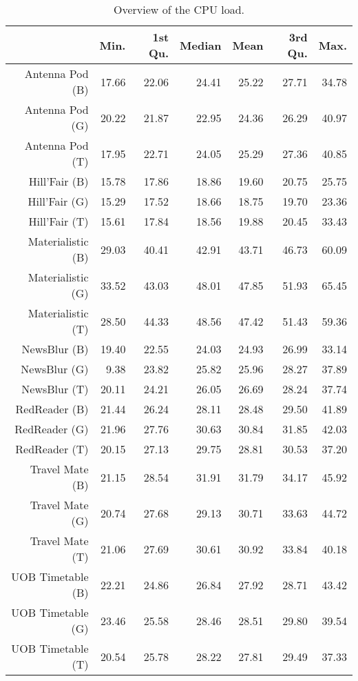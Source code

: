 \begin{table}[ht]
\centering
\begin{tabular}{rrrrrrr}
  \hline
 & Min. & 1st Qu. & Median & Mean & 3rd Qu. & Max. \\ 
  \hline
Antenna Pod (B) & 17.66 & 22.06 & 24.41 & 25.22 & 27.71 & 34.78 \\ 
  Antenna Pod (G) & 20.22 & 21.87 & 22.95 & 24.36 & 26.29 & 40.97 \\ 
  Antenna Pod (T) & 17.95 & 22.71 & 24.05 & 25.29 & 27.36 & 40.85 \\ 
  Hill'Fair (B) & 15.78 & 17.86 & 18.86 & 19.60 & 20.75 & 25.75 \\ 
  Hill'Fair (G) & 15.29 & 17.52 & 18.66 & 18.75 & 19.70 & 23.36 \\ 
  Hill'Fair (T) & 15.61 & 17.84 & 18.56 & 19.88 & 20.45 & 33.43 \\ 
  Materialistic (B) & 29.03 & 40.41 & 42.91 & 43.71 & 46.73 & 60.09 \\ 
  Materialistic (G) & 33.52 & 43.03 & 48.01 & 47.85 & 51.93 & 65.45 \\ 
  Materialistic (T) & 28.50 & 44.33 & 48.56 & 47.42 & 51.43 & 59.36 \\ 
  NewsBlur (B) & 19.40 & 22.55 & 24.03 & 24.93 & 26.99 & 33.14 \\ 
  NewsBlur (G) & 9.38 & 23.82 & 25.82 & 25.96 & 28.27 & 37.89 \\ 
  NewsBlur (T) & 20.11 & 24.21 & 26.05 & 26.69 & 28.24 & 37.74 \\ 
  RedReader (B) & 21.44 & 26.24 & 28.11 & 28.48 & 29.50 & 41.89 \\ 
  RedReader (G) & 21.96 & 27.76 & 30.63 & 30.84 & 31.85 & 42.03 \\ 
  RedReader (T) & 20.15 & 27.13 & 29.75 & 28.81 & 30.53 & 37.20 \\ 
  Travel Mate (B) & 21.15 & 28.54 & 31.91 & 31.79 & 34.17 & 45.92 \\ 
  Travel Mate (G) & 20.74 & 27.68 & 29.13 & 30.71 & 33.63 & 44.72 \\ 
  Travel Mate (T) & 21.06 & 27.69 & 30.61 & 30.92 & 33.84 & 40.18 \\ 
  UOB Timetable (B) & 22.21 & 24.86 & 26.84 & 27.92 & 28.71 & 43.42 \\ 
  UOB Timetable (G) & 23.46 & 25.58 & 28.46 & 28.51 & 29.80 & 39.54 \\ 
  UOB Timetable (T) & 20.54 & 25.78 & 28.22 & 27.81 & 29.49 & 37.33 \\ 
   \hline
\end{tabular}
\caption{Overview of the CPU load.} 
\label{tab:results:rq1:summary:cpu}
\end{table}
